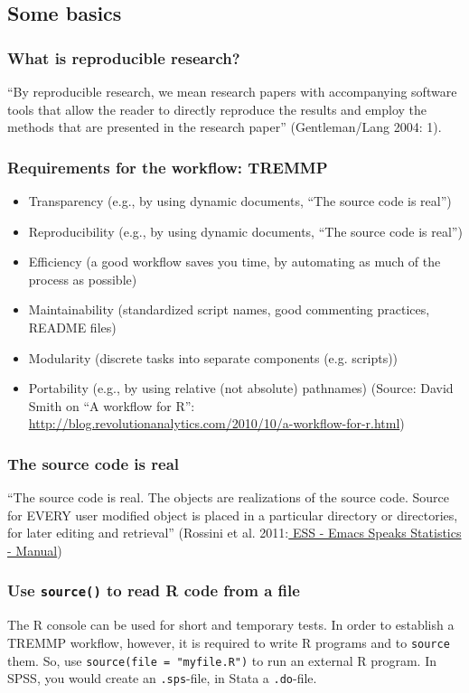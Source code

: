 \documentclass[bigger]{beamer}
\begin{document}
\subsection{Some basics}
\label{sec-7-1}
\begin{frame}
\frametitle{What is reproducible research?}
\label{sec-7-1-1}


    \enquote{By reproducible research, we mean research papers with accompanying software tools that allow the
    reader to directly reproduce the results and employ the methods that are presented in the research
    paper} (Gentleman/Lang 2004: 1). 
\end{frame}
\begin{frame}
\frametitle{Requirements for the workflow: TREMMP}
\label{sec-7-1-2}

    \small
\begin{itemize}
\item Transparency (e.g., by using dynamic documents, \enquote{The source code is real})
\item Reproducibility (e.g., by using dynamic documents, \enquote{The source code is real})
\item Efficiency (a good workflow saves you time, by automating as much of the process as possible)
\item Maintainability (standardized script names, good commenting practices, README files)
\item Modularity (discrete tasks into separate components (e.g. scripts))
\item Portability (e.g., by using relative (not absolute) pathnames)
      \vfill
      \tiny
      (Source: David Smith on \enquote{A workflow for R}: \href{http://blog.revolutionanalytics.com/2010/10/a-workflow-for-r.html}{http://blog.revolutionanalytics.com/2010/10/a-workflow-for-r.html})
\end{itemize}
\end{frame}
\begin{frame}
\frametitle{The source code is real}
\label{sec-7-1-3}

    \enquote{The source code is real. The objects are realizations of the source code. Source for EVERY user
    modified object is placed in a particular directory or directories, for later editing and retrieval}
    (Rossini et al. 2011:\href{http://ess.r-project.org/Manual/ess.html}{ ESS - Emacs Speaks Statistics - Manual})
\end{frame}
\begin{frame}
\frametitle{Use \texttt{source()} to read R code from a file}
\label{sec-7-1-4}

    The R console can be used for short and temporary tests. In order to
    establish a TREMMP workflow, however, it is required to write R programs and
    to \texttt{source} them. So, use \texttt{source(file = "myfile.R")} to run an external R
    program. In SPSS, you would create an \texttt{.sps}-file, in Stata a \texttt{.do}-file.
\end{frame}
\end{document}
